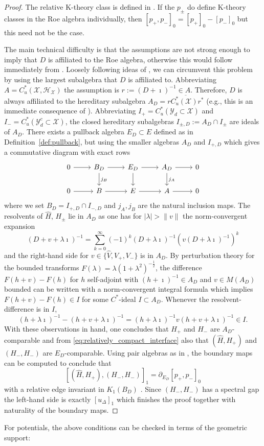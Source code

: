 \documentclass[12pt]{amsart}
\newcommand{\Hh}{{\mathcal H}}
\newcommand{\Xx}{{\mathcal X}}
\newcommand{\Yy}{{\mathcal Y}}
\newcommand{\pdv}{\partial}
\begin{document}
\begin{proof}
The relative K-theory class is defined in \cite[Definition 3.11]{KSt}. If the $p_\pm$ do define K-theory classes in the Roe algebra individually, then $[p_+,p_-]_0= [p_+]_0-[p_-]_0$ but this need not be the case.

The main technical difficulty is that the assumptions are not strong enough to imply  that $D$ is affiliated to the Roe algebra, otherwise this would follow immediately from \cite[Theorem 3.15]{KSt}. 
Loosely following ideas of \cite{Trout2000}, we can circumvent this problem by using the largest subalgebra that $D$ is affiliated to. Abbreviating $A=C^*_u(\Xx,\Hh_\Xx)$ the assumption is $r:=(D+\imath)^{-1}\in A$. Therefore, $D$ is always affiliated to the hereditary subalgebra $A_D= \overline{r C^*_u(\Xx)r^*}$ (e.g., this is an immediate consequence of \cite[Lemma 2.6]{KSt}). 
Abbreviating $I_+=C^*_u(\Yy_d\subset \Xx)$ and $I_-=C^*_u(\Yy_d^c\subset \Xx)$, the closed hereditary subalgebras $I_{\pm,D}:= A_D\cap I_\pm$ are ideals of $A_D$. There exists a pullback algebra $E_D\subset E$ defined as in Definition~\ref{def:pullback}, but using the smaller algebras $A_D$ and $I_{+,D}$ which gives a commutative diagram with exact rows
\begin{equation*}
	\begin{tikzcd}
		0 \arrow[r] & B_D \arrow[r] \arrow[d, "j_B"] & E_D \arrow[r] \arrow[d] & A_D  \arrow[d, "j_A"]  \arrow[r] & 0 \\
		 0 \arrow[r]  & B \arrow[r] & E \arrow[r] & A  \arrow[r] & 0
	\end{tikzcd}
\end{equation*}
where we set $B_D= I_{+,D}\cap I_{-,D}$ and $j_A,j_B$ are the natural inclusion maps. The resolvents of $\hat{H}$, $H_\pm$ lie in $A_D$ as one has for $|\lambda|>\|v\|$ the norm-convergent expansion $$(D+v+\lambda\imath)^{-1}=\sum_{k=0}^\infty (-1)^k (D+\lambda\imath)^{-1} (v (D+\lambda\imath)^{-1})^k$$
and the right-hand side for $v\in \{\hat{V},V_+,V_-\}$ is in $A_D$. 
By perturbation theory for the bounded transforms $F(\lambda)=\lambda(1+\lambda^2)^{-\frac12}$, the difference $F(h+v)-F(h)$ for $h$ self-adjoint with $(h+\imath)^{-1}\in A_D$ and $v\in M(A_D)$ bounded can be written with a norm-convergent integral formula \cite[Lemma 2.7]{CareyPhillips1998} which implies $F(h+v)-F(h)\in I$ for some $C^*$-ideal $I\subset A_D$. 
Whenever the resolvent-difference is in $I$,
$$(h+\lambda\imath)^{-1}-(h+v+\lambda\imath)^{-1}=(h+\lambda\imath)^{-1} v (h+v+\lambda\imath)^{-1} \in I.$$
With these observations in hand, one concludes that $H_+$ and $H_-$ are $A_D$-comparable and from \eqref{eq:relatively_compact_interface} also that $(\hat{H},H_+)$ and $(H_-,H_-)$ are $E_D$-comparable. Using pair algebras as in \cite[Proposition 3.10, Theorem 3.15]{KSt}, the boundary maps can be computed to conclude that
$$[(\hat{H},H_+), (H_-,H_-)]_1=\pdv_{E_D} [p_+,p_-]_0$$
with a relative edge invariant in $K_1(B_D)$ \cite[Definition 3.11]{KSt}. Since $(H_-,H_-)$ has a spectral gap the left-hand side is exactly $[u_\Delta]_1$ which finishes the proof together with naturality of the boundary maps.
\end{proof}
For potentials, the above conditions can be checked in terms of the geometric support:
\end{document}
